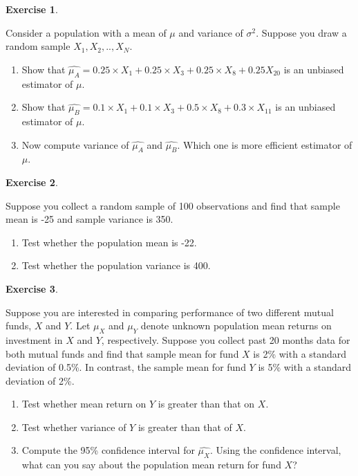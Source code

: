 \documentclass[
]{book}
\theoremstyle{definition}
\theoremstyle{definition}
\theoremstyle{definition}
\newtheorem{exercise}{Exercise}[chapter]
\theoremstyle{definition}
\theoremstyle{remark}
\begin{document}
\begin{exercise}
\protect\hypertarget{exr:unnamed-chunk-100}{}\label{exr:unnamed-chunk-100}

Consider a population with a mean of \(\mu\) and variance of \(\sigma^2\). Suppose you draw a random sample \(X_1, X_2,..,X_N\).

\begin{enumerate}
\def\labelenumi{\alph{enumi}.}
\item
  Show that \(\widehat{\mu_A}=0.25\times X_1 +0.25\times X_3+ 0.25 \times X_8 + 0.25 X_{20}\) is an unbiased estimator of \(\mu\).
\item
  Show that \(\widehat{\mu_B}=0.1\times X_1 +0.1\times X_3+ 0.5 \times X_8+0.3 \times X_{11}\) is an unbiased estimator of \(\mu\).
\item
  Now compute variance of \(\widehat{\mu_A}\) and \(\widehat{\mu_B}\). Which one is more efficient estimator of \(\mu\).
\end{enumerate}

\end{exercise}

\begin{exercise}
\protect\hypertarget{exr:unnamed-chunk-101}{}\label{exr:unnamed-chunk-101}

Suppose you collect a random sample of 100 observations and find that sample mean is -25 and sample variance is 350.

\begin{enumerate}
\def\labelenumi{\alph{enumi}.}
\item
  Test whether the population mean is -22.
\item
  Test whether the population variance is 400.
\end{enumerate}

\end{exercise}

\begin{exercise}
\protect\hypertarget{exr:unnamed-chunk-102}{}\label{exr:unnamed-chunk-102}

Suppose you are interested in comparing performance of two different mutual funds, \(X\) and \(Y\). Let \(\mu_X\) and \(\mu_Y\) denote unknown population mean returns on investment in \(X\) and \(Y\), respectively. Suppose you collect past 20 months data for both mutual funds and find that sample mean for fund \(X\) is 2\% with a standard deviation of 0.5\%. In contrast, the sample mean for fund \(Y\) is 5\% with a standard deviation of 2\%.

\begin{enumerate}
\def\labelenumi{\alph{enumi}.}
\item
  Test whether mean return on \(Y\) is greater than that on \(X\).
\item
  Test whether variance of \(Y\) is greater than that of \(X\).
\item
  Compute the 95\% confidence interval for \(\widehat{\mu_X}\). Using the confidence interval, what can you say about the population mean return for fund \(X\)?
\end{enumerate}

\end{exercise}
\end{document}
